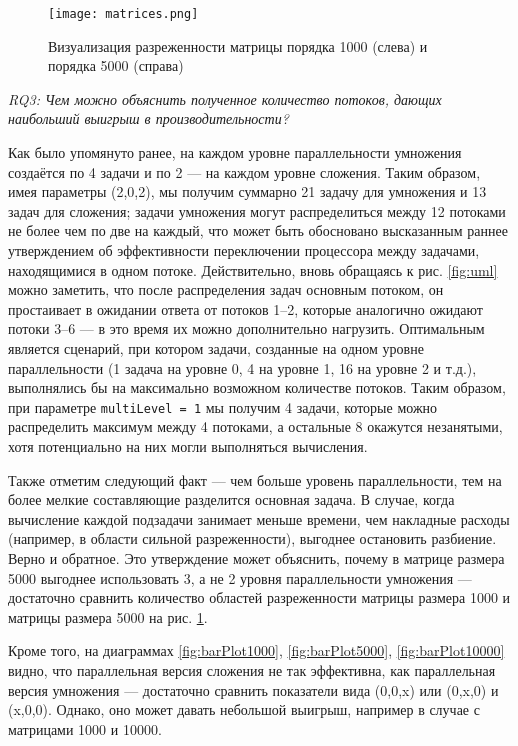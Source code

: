 \begin{figure}
    \centering
    \texttt{[image: matrices.png]}
    \caption{Визуализация разреженности матрицы порядка 1000 (слева) и порядка 5000 (справа)}
    \label{fig:mtx}
\end{figure}

\textit{RQ3:  Чем можно объяснить полученное количество потоков, дающих наибольший выигрыш в производительности?}

Как было упомянуто ранее, на каждом уровне параллельности умножения создаётся по 4 задачи и по 2 --- на каждом уровне сложения. Таким образом,  имея параметры (2,0,2), мы получим суммарно 21 задачу для умножения и 13 задач для сложения; задачи умножения могут распределиться между 12 потоками не более чем по две на каждый, что может быть обосновано высказанным раннее утверждением об эффективности переключении процессора между задачами, находящимися в одном потоке. Действительно, вновь обращаясь к рис. \ref{fig:uml} можно заметить, что после распределения задач основным потоком, он простаивает в ожидании ответа от потоков 1--2, которые аналогично ожидают потоки 3--6 --- в это время их можно дополнительно нагрузить. Оптимальным является сценарий, при котором задачи, созданные на одном уровне параллельности (1 задача на уровне 0, 4 на уровне 1, 16 на уровне 2 и т.д.), выполнялись бы на максимально возможном количестве потоков. Таким образом, при параметре \texttt{multiLevel = 1} мы получим 4 задачи, которые можно распределить максимум между 4 потоками, а остальные 8 окажутся незанятыми, хотя потенциально на них могли выполняться вычисления. 

Также отметим следующий факт --- чем больше уровень параллельности, тем на более мелкие составляющие разделится основная задача. В случае, когда вычисление каждой подзадачи занимает меньше времени, чем накладные расходы (например, в области сильной разреженности), выгоднее остановить разбиение. Верно и обратное. Это утверждение может объяснить, почему в матрице размера 5000 выгоднее использовать 3, а не 2 уровня параллельности умножения ---достаточно сравнить количество областей разреженности матрицы размера 1000 и матрицы размера 5000 на рис. \ref{fig:mtx}.

Кроме того, на диаграммах \ref{fig:barPlot1000}, \ref{fig:barPlot5000}, \ref{fig:barPlot10000} видно, что параллельная версия сложения не так эффективна, как параллельная версия умножения --- достаточно сравнить показатели вида (0,0,x) или (0,x,0) и (x,0,0). Однако, оно может давать небольшой выигрыш, например в случае с матрицами 1000 и 10000.

